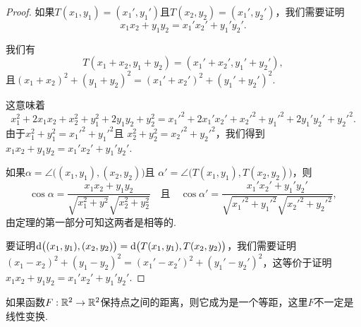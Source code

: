 \begin{proof}
  如果$T(x_1,y_1)=(x_1',y_1')$且$T(x_2,y_2)=(x_1',y_2')$，我们需要证明
  \[
    x_1x_2 + y_1y_2 = x_1'x_2' + y_1'y_2'.
  \]

  我们有
  \[
    T(x_1+x_2,y_1+y_2) = (x_1'+x_2',y_1'+y_2'),
  \]
  且$(x_1+x_2)^2+(y_1+y_2)^2=(x_1'+x_2')^2+(y_1'+y_2')^2$.

  这意味着
  \[
    x_1^2 + 2x_1x_2 + x_2^2 + y_1^2 + 2y_1y_2 + y_2^2 = x_1'^2 + 2x_1'x_2' + x_2'^2 + y_1'^2 + 2y_1'y_2' + y_2'^2.
  \]
  由于$x_1^2+y_1^2=x_1'^2+y_1'^2$且
  $x_2^2+y_2^2=x_2'^2+y_2'^2$，我们得到$x_1x_2+y_1y_2=x_1'x_2'+y_1'y_2'$.

  如果$\alpha=\angle\big((x_1,y_1),(x_2,y_2)\big)$且
  $\alpha'=\angle \big( T(x_1,y_1),T(x_2,y_2) \big)$，则
  \[
    \cos\alpha = \frac{x_1x_2+y_1y_2}{\sqrt{x_1^2+y^2}
    \sqrt{x_2^2+y_2^2}} \quad \text{且} \quad
    \cos\alpha' = \frac{x_1'x_2'+y_1'y_2'}{\sqrt{x_1'^2+y_1'^2}
    \sqrt{x_2'^2+y_2'^2}},
  \]
  由定理的第一部分可知这两者是相等的.

  要证明$\mathop{}\!\mathrm d\big((x_1,y_1),(x_2,y_2)\big)=
  \mathop{}\!\mathrm d\big(T(x_1,y_1),T(x_2,y_2)\big)$，我们需要证明$(x_1-x_2)^2+(y_1-y_2)^2=(x_1'-x_2')^2+(y_1'-y_2')^2$，这等价于证明$x_1x_2+y_1y_2=x_1'x_2'+y_1'y_2'$.
\end{proof}

\begin{definition}
  如果函数$F:\mathbb R^2\to\mathbb R^2$保持点之间的距离，则它成为是一个等距，这里$F$不一定是线性变换.
\end{definition}

